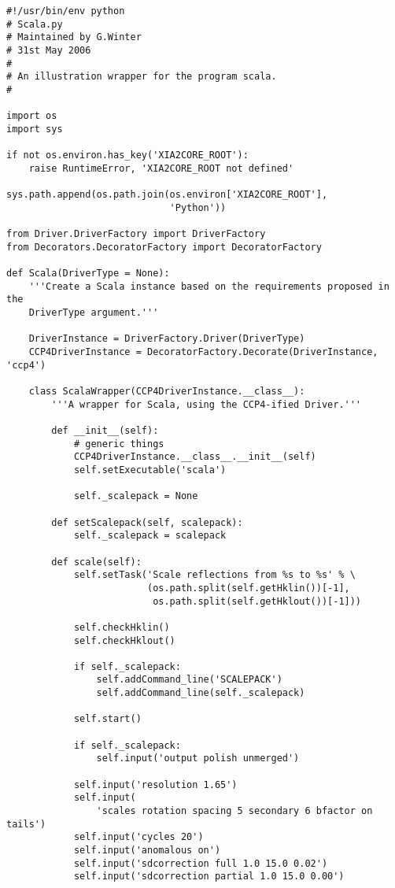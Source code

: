 \documentclass[a4paper, 11pt]{article}
\begin{document}
{
\tiny
\begin{verbatim}
#!/usr/bin/env python
# Scala.py
# Maintained by G.Winter
# 31st May 2006
# 
# An illustration wrapper for the program scala.
# 

import os
import sys

if not os.environ.has_key('XIA2CORE_ROOT'):
    raise RuntimeError, 'XIA2CORE_ROOT not defined'

sys.path.append(os.path.join(os.environ['XIA2CORE_ROOT'],
                             'Python'))

from Driver.DriverFactory import DriverFactory
from Decorators.DecoratorFactory import DecoratorFactory

def Scala(DriverType = None):
    '''Create a Scala instance based on the requirements proposed in the
    DriverType argument.'''

    DriverInstance = DriverFactory.Driver(DriverType)
    CCP4DriverInstance = DecoratorFactory.Decorate(DriverInstance, 'ccp4')

    class ScalaWrapper(CCP4DriverInstance.__class__):
        '''A wrapper for Scala, using the CCP4-ified Driver.'''

        def __init__(self):
            # generic things
            CCP4DriverInstance.__class__.__init__(self)
            self.setExecutable('scala')

            self._scalepack = None

        def setScalepack(self, scalepack):
            self._scalepack = scalepack

        def scale(self):
            self.setTask('Scale reflections from %s to %s' % \
                         (os.path.split(self.getHklin())[-1],
                          os.path.split(self.getHklout())[-1]))

            self.checkHklin()
            self.checkHklout()

            if self._scalepack:
                self.addCommand_line('SCALEPACK')
                self.addCommand_line(self._scalepack)

            self.start()

            if self._scalepack:
                self.input('output polish unmerged')

            self.input('resolution 1.65')
            self.input(
                'scales rotation spacing 5 secondary 6 bfactor on tails')
            self.input('cycles 20')
            self.input('anomalous on')
            self.input('sdcorrection full 1.0 15.0 0.02')
            self.input('sdcorrection partial 1.0 15.0 0.00')


\end{verbatim}}
\end{document}
